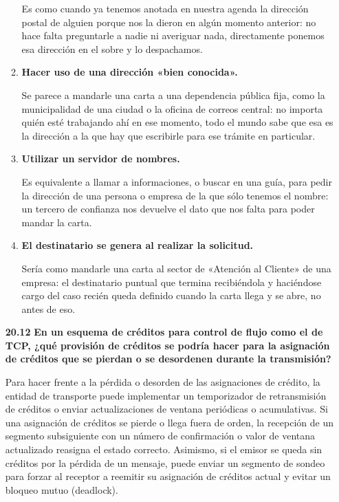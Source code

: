 \documentclass[11pt,a4paper]{article}
\begin{document}
\begin{enumerate}
\begin{enumerate}[label=\alph*)]
        Es como cuando ya tenemos anotada en nuestra agenda la dirección postal de alguien porque nos la dieron en algún momento anterior: no hace falta preguntarle a nadie ni averiguar nada, directamente ponemos esa dirección en el sobre y lo despachamos.

        \item \textbf{Hacer uso de una dirección «bien conocida».}

        Se parece a mandarle una carta a una dependencia pública fija, como la municipalidad de una ciudad o la oficina de correos central: no importa quién esté trabajando ahí en ese momento, todo el mundo sabe que esa es la dirección a la que hay que escribirle para ese trámite en particular.

        \item \textbf{Utilizar un servidor de nombres.}

        Es equivalente a llamar a informaciones, o buscar en una guía, para pedir la dirección de una persona o empresa de la que sólo tenemos el nombre: un tercero de confianza nos devuelve el dato que nos falta para poder mandar la carta.

        \item \textbf{El destinatario se genera al realizar la solicitud.}

        Sería como mandarle una carta al sector de «Atención al Cliente» de una empresa: el destinatario puntual que termina recibiéndola y haciéndose cargo del caso recién queda definido cuando la carta llega y se abre, no antes de eso.
    \end{enumerate}

    \item[\textbf{20.12}] \textbf{En un esquema de créditos para control de flujo como el de TCP, ¿qué provisión de créditos se podría hacer para la asignación de créditos que se pierdan o se desordenen durante la transmisión?}

Para hacer frente a la pérdida o desorden de las asignaciones de crédito, la entidad de transporte puede implementar un temporizador de retransmisión de créditos o enviar actualizaciones de ventana periódicas o acumulativas. Si una asignación de créditos se pierde o llega fuera de orden, la recepción de un segmento subsiguiente con un número de confirmación o valor de ventana actualizado reasigna el estado correcto. Asimismo, si el emisor se queda sin créditos por la pérdida de un mensaje, puede enviar un segmento de sondeo para forzar al receptor a reemitir su asignación de créditos actual y evitar un bloqueo mutuo (deadlock).


\end{enumerate}
\end{document}
